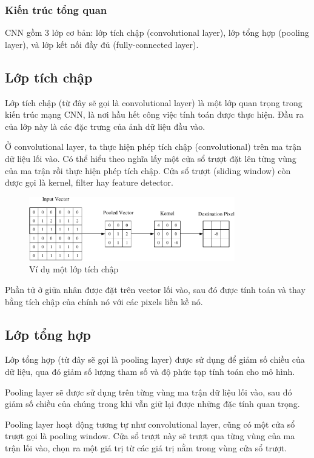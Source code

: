 \subsubsection{Kiến trúc tổng quan}
CNN gồm 3 lớp cơ bản: lớp tích chập (convolutional layer), lớp tổng hợp (pooling layer), và lớp kết nối đầy đủ (fully-connected layer). 

\subsection{Lớp tích chập}
Lớp tích chập (từ đây sẽ gọi là convolutional layer) là một lớp quan trọng trong kiến trúc mạng CNN, là nơi hầu hết công việc tính toán được thực hiện. Đầu ra của lớp này là các đặc trưng của ảnh dữ liệu đầu vào. 

Ở convolutional layer, ta thực hiện phép tích chập (convolutional) trên ma trận dữ liệu lối vào. Có thể hiểu theo nghĩa lấy một cửa sổ trượt đặt lên từng vùng của ma trận rồi thực hiện phép tích chập. Cửa sổ trượt (sliding window) còn được gọi là kernel, filter hay feature detector.

\begin{figure}[!h]
\center
\includegraphics[width=0.8\textwidth]{figures/convlayer.pdf}
\caption{Ví dụ một lớp tích chập\cite{oshea2015introduction}}\label{fig:visual}
\end{figure}
Phần tử ở giữa nhân được đặt trên vector lối vào, sau đó được tính toán và thay bằng tích chập của chính nó với các pixels liền kề nó.

\subsection{Lớp tổng hợp}
Lớp tổng hợp (từ đây sẽ gọi là pooling layer) được sử dụng để giảm số chiều của dữ liệu, qua đó giảm số lượng tham số và độ phức tạp tính toán cho mô hình. 

Pooling layer sẽ được sử dụng trên từng vùng ma trận dữ liệu lối vào, sau đó giảm số chiều của chúng trong khi vẫn giữ lại được những đặc tính quan trọng.  

Pooling layer hoạt động tương tự như convolutional layer, cũng có một cửa sổ trượt gọi là pooling window. Cửa sổ trượt này sẽ trượt qua từng vùng của ma trận lối vào, chọn ra một giá trị từ các giá trị nằm trong vùng cửa sổ trượt. 


